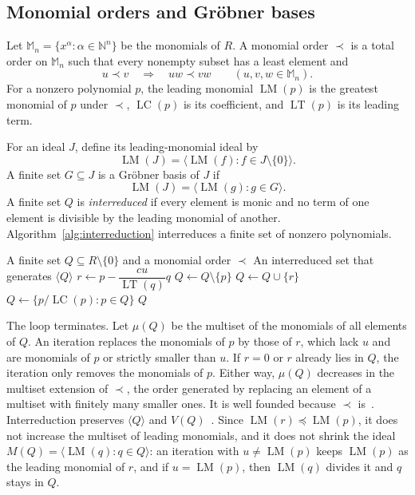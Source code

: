 \subsection{Monomial orders and Gr\"obner bases}
\label{subsec:groebner}

Let $\mathbb M_n=\{x^\alpha:\alpha\in\mathbb N^n\}$ be the monomials of $R$.
A monomial order $\prec$ is a total order on $\mathbb M_n$ such that every
nonempty subset has a least element and
\[
  u\prec v \quad\Longrightarrow\quad uw\prec vw
  \qquad (u,v,w\in\mathbb M_n).
\]
For a nonzero polynomial $p$, the leading monomial $\operatorname{LM}(p)$ is
the greatest monomial of $p$ under $\prec$, $\operatorname{LC}(p)$ is its
coefficient, and $\operatorname{LT}(p)$ is its leading term.

For an ideal $J$, define its leading-monomial ideal by
\[
  \operatorname{LM}(J) =\langle\operatorname{LM}(f):f\in J\setminus\{0\}\rangle.
\]
A finite set $G\subseteq J$ is a Gr\"obner basis of $J$ if
\[
  \operatorname{LM}(J) =\langle\operatorname{LM}(g):g\in G\rangle.
\]
A finite set $Q$ is \emph{interreduced} if every element is monic and no term
of one element is divisible by the leading monomial of another.
Algorithm~\ref{alg:interreduction} interreduces a finite set of nonzero
polynomials.

\begin{algorithm}[H]
  \caption{Interreduction}
  \label{alg:interreduction}
  \begin{algorithmic}[1]
    \Require A finite set $Q\subseteq R\setminus\{0\}$ and a monomial
    order $\prec$
    \Ensure An interreduced set that generates $\langle Q\rangle$
    \State $r\gets p-\dfrac{cu}{\operatorname{LT}(q)}q$
    \State $Q\gets Q\setminus\{p\}$
    \State $Q\gets Q\cup\{r\}$
    \EndIf
    \EndWhile
    \State $Q\gets\{p/\operatorname{LC}(p):p\in Q\}$
    \State \Return $Q$
  \end{algorithmic}
\end{algorithm}

The loop terminates. Let $\mu(Q)$ be the multiset of the monomials of all
elements of $Q$. An iteration replaces the monomials of $p$ by those of $r$,
which lack $u$ and are monomials of $p$ or strictly smaller than $u$. If $r=0$
or $r$ already lies in $Q$, the iteration only removes the monomials of $p$.
Either way, $\mu(Q)$ decreases in the multiset extension of $\prec$, the
order generated by replacing an element of a multiset with finitely many
smaller ones. It is well founded because $\prec$
is~\cite{dershowitz1979proving}. Interreduction preserves
$\langle Q\rangle$ and $V(Q)$~\cite[Ch.~2, \S7]{cox2015ideals}. Since
$\operatorname{LM}(r)\preceq\operatorname{LM}(p)$, it does not increase the
multiset of leading monomials, and it does not shrink the ideal
$M(Q)=\langle\operatorname{LM}(q):q\in Q\rangle$: an iteration with
$u\neq\operatorname{LM}(p)$ keeps $\operatorname{LM}(p)$ as the leading
monomial of $r$, and if $u=\operatorname{LM}(p)$, then $\operatorname{LM}(q)$
divides it and $q$ stays in $Q$.

